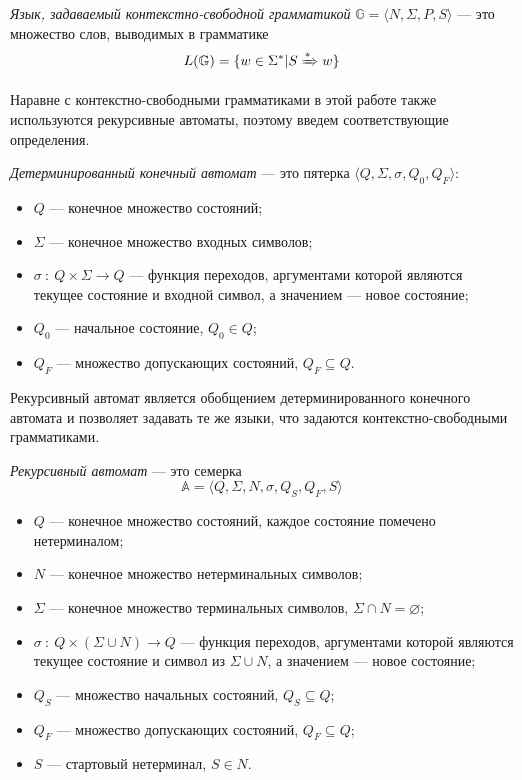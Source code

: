 \begin{rudefinition}
     \emph{Язык, задаваемый контекстно-свободной грамматикой} $\mathbb{G} = \langle N, \Sigma, P, S \rangle$ --- это множество слов, выводимых в грамматике $$L(\mathbb{G}) = \{ w \in \Sigma^* | S \xRightarrow[]{*} w\}$$
\end{rudefinition}

Наравне с контекстно-свободными грамматиками в этой работе также используются рекурсивные автоматы, поэтому введем соответствующие определения.

\begin{rudefinition}
    \emph{Детерминированный конечный автомат} --- это пятерка $\langle Q, \Sigma, \sigma, Q_{0}, Q_{F}\rangle$:
    \begin{itemize}
        \item $Q$ --- конечное множество состояний;
        \item $\Sigma$ --- конечное множество входных символов;
        \item $\sigma ~:~ Q \times \Sigma \rightarrow Q$ --- функция переходов, аргументами которой являются текущее состояние и входной символ, а значением --- новое состояние;
        \item $Q_{0}$ --- начальное состояние, $Q_{0} \in Q$;
        \item $Q_{F}$ --- множество допускающих состояний, $Q_{F} \subseteq Q$.
    \end{itemize}
\end{rudefinition}

Рекурсивный автомат является обобщением детерминированного конечного автомата и позволяет задавать те же языки, что задаются контекстно-свободными грамматиками.

\begin{rudefinition}
    \emph{Рекурсивный автомат} --- это семерка $$\mathbb{A} = \langle Q, \Sigma, N, \sigma, Q_{S}, Q_{F}, S\rangle$$
    \begin{itemize}
        \item $Q$ --- конечное множество состояний, каждое состояние помечено нетерминалом;
        \item $N$ --- конечное множество нетерминальных символов;
        \item $\Sigma$ --- конечное множество терминальных символов, $\Sigma \cap N = \varnothing$;
        \item $\sigma ~:~ Q \times (\Sigma \cup N) \rightarrow Q$ --- функция переходов, аргументами которой являются текущее состояние и символ из $\Sigma \cup N$, а значением --- новое состояние;
        \item $Q_{S}$ --- множество начальных состояний, $Q_{S} \subseteq Q$;
        \item $Q_{F}$ --- множество допускающих состояний, $Q_{F} \subseteq Q$;
        \item $S$ --- стартовый нетерминал, $S \in N$.
    \end{itemize}
\end{rudefinition}

